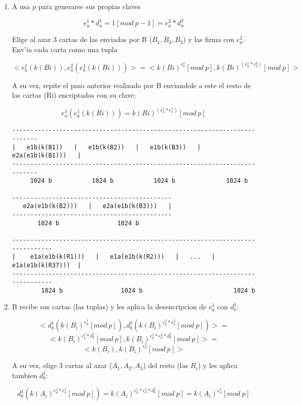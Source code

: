 \begin{enumerate}
  


\item A usa $p$ para generarse sus propias claves

$$	e^1_a * d^1_a = 1 [mod\ p-1] = e^2_a * d^2_a $$

Elige al azar 3 cartas de las enviadas por B ($B_1, B_2, B_3$) y las firma con $e^2_a$. Env'ia cada carta como una tupla

$$	<e^1_b(k(Bi)), 			e^2_a(e^1_b(k(Bi)))> = 
	<k(Bi)^{e^1_b} [mod\ p], 	k(Bi)^(e^1_b * e^2_a) [mod\ p]> $$
	
A su vez, repite el paso anterior realizado por B enviandole a este el resto de las cartas (Ri) encriptadas con su clave:

$$	e^1_a(e^1_b(k(Ri))) = k(Ri)^(e^1_b * e^1_a) [mod\ p] $$
	

\begin{verbatim}
--------------------------------------------------------------------------
|   e1b(k(B1))   |   e1b(k(B2))   |   e1b(k(B3))   |   e2a(e1b(k(B1)))   |
--------------------------------------------------------------------------
     1024 b           1024 b           1024 b              1024 b         

--------------------------------------------
   e2a(e1b(k(B2)))   |   e2a(e1b(k(B3)))   |
--------------------------------------------
       1024 b                1024 b         

------------------------------------------------------------------------------
|    e1a(e1b(k(R1)))   |   e1a(e1b(k(R2)))   |   ...   |   e1a(e1b(k(R37)))  |
------------------------------------------------------------------------------
        1024 b                1024 b                         1024 b           
\end{verbatim}
	
	
	
	
	
\item B recibe sus cartas (las tuplas) y les aplica la desencripcion de $e^1_b$ con $d^1_b$:

$$	<d^1_b(k(B_i)^{e^1_b} [mod\ p]), 		d^1_b(k(B_i)^{e^1_b * e^2_a} [mod\ p])> = $$
$$	<k(B_i)^{e^1_b * d^1_b} [mod\ p], 	k(B_i)^{e^1_b * e^2_a * d^1_b} [mod\ p]> = $$
$$	<k(B_i), 						k(B_i)^{e^2_a} [mod\ p]> $$

A su vez, elige 3 cartas al azar ($A_1, A_2, A_3$) del resto (las $R_i$) y les aplica tambien $d^1_b$:
	
$$	d^1_b(k(A_i)^{e^1_b * e^1_a} [mod\ p]) = 
	k(A_i)^{e^1_b * e^1_a * d^1_b} [mod\ p] =
	k(A_i)^{e^1_a} [mod\ p] $$


\end{enumerate}
